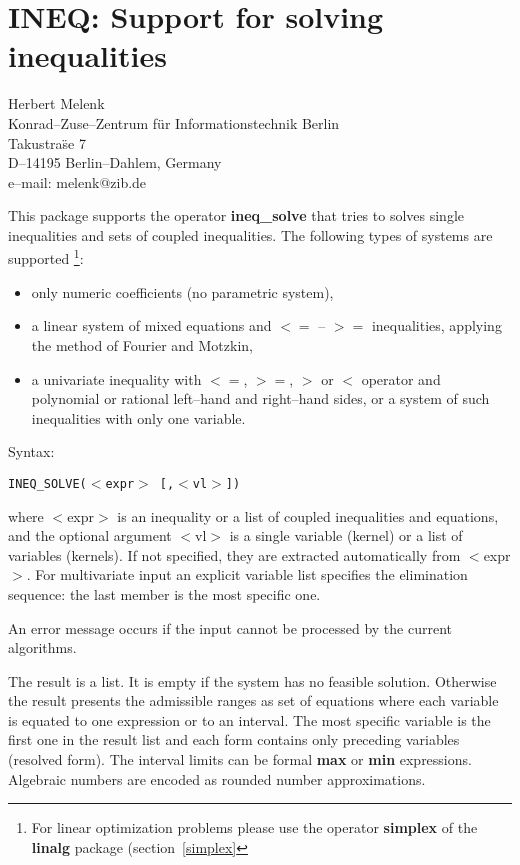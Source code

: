 \chapter{INEQ: Support for solving inequalities}
\label{INEQ}

{\footnotesize
\begin{center}
Herbert Melenk \\
Konrad--Zuse--Zentrum f\"ur Informationstechnik Berlin \\
Takustra\"se 7 \\
D--14195 Berlin--Dahlem, Germany \\[0.05in]
e--mail: melenk@zib.de
\end{center}
}


This package supports the operator {\bf ineq\_solve} that
tries to solves single inequalities and sets of coupled inequalities.
The following types of systems are supported
\footnote{For linear optimization problems please use the operator
{\bf simplex} of the {\bf linalg} package (section~\ref{simplex}}:
\begin{itemize}
\item only numeric coefficients (no parametric system),
\item a linear system of mixed equations and $<=$ -- $>=$
     inequalities, applying the method of Fourier and Motzkin,
\item a univariate inequality with $<=$, $>=$, $>$ or $<$ operator
     and polynomial or rational left--hand and right--hand sides,
     or a system of such inequalities with only one variable.
\end{itemize}

Syntax:
\begin{center}
{\tt INEQ\_SOLVE($<$expr$>$ [,$<$vl$>$])}
\end{center}
where $<$expr$>$ is an inequality or a list of coupled inequalities
and equations, and the optional argument $<$vl$>$ is a single
variable (kernel) or a list of variables (kernels).  If not
specified, they are extracted automatically from $<$expr$>$.
For multivariate input an explicit variable list specifies the
elimination sequence: the last member is the most specific one.

An error message occurs if the input cannot be processed by the
current algorithms.

The result is a list.  It is empty if the system has no feasible
solution.  Otherwise the result presents the admissible ranges as set
of equations where each variable is equated to one expression or to an
interval.  The most specific variable is the first one in the result
list and each form contains only preceding variables (resolved form).
The interval limits can be formal {\bf max} or {\bf min} expressions.
Algebraic numbers are encoded as rounded number approximations.


